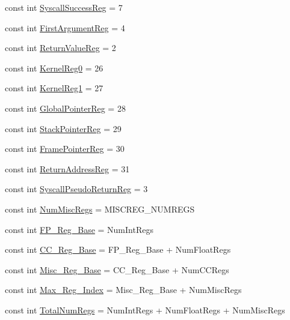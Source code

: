 \begin{DoxyCompactItemize}
\item 
const int \hyperlink{namespaceMipsISA_a5b14981f767959a404638f100f655dfd}{SyscallSuccessReg} = 7
\item 
const int \hyperlink{namespaceMipsISA_aa197a357910726362c5838276505451c}{FirstArgumentReg} = 4
\item 
const int \hyperlink{namespaceMipsISA_a472eedbcba9726645062b921f8d07e98}{ReturnValueReg} = 2
\item 
const int \hyperlink{namespaceMipsISA_a8d50c6c7b627deffa6d6df6e65a4c951}{KernelReg0} = 26
\item 
const int \hyperlink{namespaceMipsISA_a8e9046ea0f091c172954240929973e61}{KernelReg1} = 27
\item 
const int \hyperlink{namespaceMipsISA_a42a8213b818bed679ff1775c13414b85}{GlobalPointerReg} = 28
\item 
const int \hyperlink{namespaceMipsISA_a95d0846360ad0e64cb42fda7268a6434}{StackPointerReg} = 29
\item 
const int \hyperlink{namespaceMipsISA_aabd6fa5889c9ccc124dfd4a984046f6f}{FramePointerReg} = 30
\item 
const int \hyperlink{namespaceMipsISA_a99ba4a35fbf9debeb1f7ddb1db7b9967}{ReturnAddressReg} = 31
\item 
const int \hyperlink{namespaceMipsISA_ab566b6da98edbb32e80291edaf0906ba}{SyscallPseudoReturnReg} = 3
\item 
const int \hyperlink{namespaceMipsISA_a568d4aa96dd7cd963f3b1b1b0446c9c6}{NumMiscRegs} = MISCREG\_\-NUMREGS
\item 
const int \hyperlink{namespaceMipsISA_a833d6deee31e8a9398618efdc22effde}{FP\_\-Reg\_\-Base} = NumIntRegs
\item 
const int \hyperlink{namespaceMipsISA_ab1d4916ec3ee18e808b3452603742d38}{CC\_\-Reg\_\-Base} = FP\_\-Reg\_\-Base + NumFloatRegs
\item 
const int \hyperlink{namespaceMipsISA_a0ff03b99f2760c682de4e9cb0a3cd8a1}{Misc\_\-Reg\_\-Base} = CC\_\-Reg\_\-Base + NumCCRegs
\item 
const int \hyperlink{namespaceMipsISA_a436c085ed5c04b95a1c0cbcc728c39d4}{Max\_\-Reg\_\-Index} = Misc\_\-Reg\_\-Base + NumMiscRegs
\item 
const int \hyperlink{namespaceMipsISA_a578a3508d56f10e933ba9559e2cf907c}{TotalNumRegs} = NumIntRegs + NumFloatRegs + NumMiscRegs
\end{DoxyCompactItemize}
